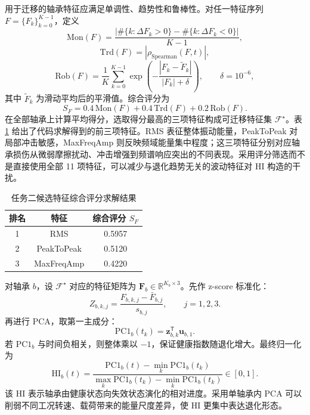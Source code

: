 用于迁移的轴承特征应满足单调性、趋势性和鲁棒性。对任一特征序列 $F=\{F_k\}_{k=0}^{K-1}$，定义
\begin{equation}
  \label{eq:q2_mon}
  \mathrm{Mon}(F)=
  \frac{
  \left|
  \#\{k:\Delta F_k>0\}
  -
  \#\{k:\Delta F_k<0\}
  \right|
  }{K-1},
\end{equation}
\begin{equation}
  \label{eq:q2_trd}
  \mathrm{Trd}(F)=|\rho_{\mathrm{Spearman}}(F,t)|,
\end{equation}
\begin{equation}
  \label{eq:q2_rob}
  \mathrm{Rob}(F)
  =
  \frac{1}{K}
  \sum_{k=0}^{K-1}
  \exp\left(
    -\frac{|F_k-\tilde F_k|}{|F_k|+\delta}
  \right),
  \qquad \delta=10^{-6},
\end{equation}
其中 $\tilde F_k$ 为滑动平均后的平滑值。综合评分为
\begin{equation}
  \label{eq:q2_score}
  S_F=0.4\,\mathrm{Mon}(F)+0.4\,\mathrm{Trd}(F)+0.2\,\mathrm{Rob}(F).
\end{equation}
在全部轴承上计算平均得分，选取得分最高的三项特征构成可迁移特征集 $\mathcal F^\star$。表 \ref{tab:q2_feature_solution} 给出了代码求解得到的前三项特征。RMS 表征整体振动能量，PeakToPeak 对局部冲击敏感，MaxFreqAmp 则反映频域能量集中程度；这三项特征分别对应轴承损伤从微弱摩擦扰动、冲击增强到频谱响应突出的不同表现。采用评分筛选而不是直接使用全部 11 项特征，可以减少与退化趋势无关的波动特征对 HI 构造的干扰。
\begin{table}[H]
  \centering
  \caption{任务二候选特征综合评分求解结果}
  \label{tab:q2_feature_solution}
  \begin{tabular}{ccc}
    \toprule
    排名 & 特征 & 综合评分 $S_F$ \\
    \midrule
    1 & RMS & 0.5957 \\
    2 & PeakToPeak & 0.5120 \\
    3 & MaxFreqAmp & 0.4220 \\
    \bottomrule
  \end{tabular}
\end{table}

对轴承 $b$，设 $\mathcal F^\star$ 对应的特征矩阵为 $\mathbf F_b\in\mathbb R^{K_b\times 3}$。先作 z-score 标准化：
\begin{equation}
  \label{eq:q2_zscore}
  Z_{b,k,j}=\frac{F_{b,k,j}-\bar F_{b,j}}{s_{b,j}},
  \qquad j=1,2,3.
\end{equation}
再进行 PCA，取第一主成分：
\begin{equation}
  \label{eq:q2_pca}
  \mathrm{PC1}_b(t_k)=\mathbf z_{b,k}^{\mathsf T}\mathbf u_{b,1}.
\end{equation}
若 $\mathrm{PC1}_b$ 与时间负相关，则整体乘以 $-1$，保证健康指数随退化增大。最终归一化为
\begin{equation}
  \label{eq:q2_hi}
  \mathrm{HI}_b(t)=
  \frac{
    \mathrm{PC1}_b(t)-\min_k \mathrm{PC1}_b(t_k)
  }{
    \max_k \mathrm{PC1}_b(t_k)-\min_k \mathrm{PC1}_b(t_k)
  }\in[0,1].
\end{equation}
该 HI 表示轴承由健康状态向失效状态演化的相对进度。采用单轴承内 PCA 可以削弱不同工况转速、载荷带来的能量尺度差异，使 HI 更集中表达退化形态。


